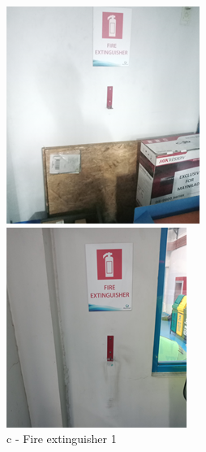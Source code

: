 \begin{figure}[!htb]
\begin{minipage}[b]{0.22\linewidth}
		\includegraphics[width=\textwidth]{figures/ch05_fdas_sd09}
		\caption*{c - Fire extinguisher 1}
	\end{minipage}
	\hspace{0.03cm}
	\begin{minipage}[b]{0.22\linewidth}
		\centering
		\includegraphics[width=\textwidth]{figures/ch05_fdas_sd10}

\end{minipage}
\end{figure}
